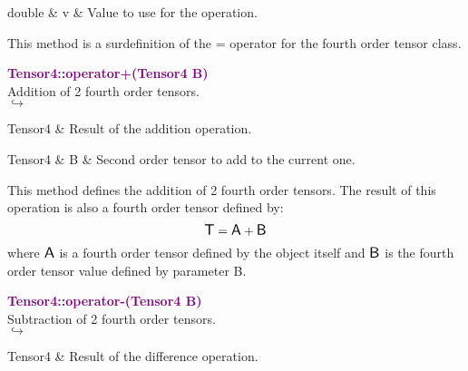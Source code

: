 \begin{tcolorbox}[width=\textwidth,myArgs,tabularx={ll|R}]
double & v & Value to use for the operation.
\end{tcolorbox}

This method is a surdefinition of the = operator for the fourth order tensor class.

\textcolor{purple}{\textbf{Tensor4::operator+(Tensor4 B)}}\label{Tensor4::operator+(Tensor4 B)}\\
Addition of 2 fourth order tensors.\\ \hspace*{5mm}$\hookrightarrow$
\vspace*{-2em}\begin{tcolorbox}[grow to left by=-1cm, width=\textwidth-1cm,myArgs,tabularx={l|R}]
Tensor4 & Result of the addition operation.
\end{tcolorbox}

\begin{tcolorbox}[width=\textwidth,myArgs,tabularx={ll|R}]
Tensor4 & B & Second order tensor to add to the current one.
\end{tcolorbox}

This method defines the addition of 2 fourth order tensors.
The result of this operation is also a fourth order tensor defined by:
\begin{equation*}
\mbox{\large\ensuremath{\mathsf{T}}} = \mbox{\large\ensuremath{\mathsf{A}}} + \mbox{\large\ensuremath{\mathsf{B}}}
\end{equation*}
where $\mbox{\large\ensuremath{\mathsf{A}}}$ is a fourth order tensor defined by the object itself and $\mbox{\large\ensuremath{\mathsf{B}}}$ is the fourth order tensor value defined by parameter B.

\textcolor{purple}{\textbf{Tensor4::operator-(Tensor4 B)}}\label{Tensor4::operator-(Tensor4 B)}\\
Subtraction of 2 fourth order tensors.\\ \hspace*{5mm}$\hookrightarrow$
\vspace*{-2em}\begin{tcolorbox}[grow to left by=-1cm, width=\textwidth-1cm,myArgs,tabularx={l|R}]
Tensor4 & Result of the difference operation.
\end{tcolorbox}

